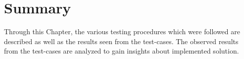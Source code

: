 \section{Summary}

Through this Chapter, the various testing procedures which were followed are described as well as the results seen from the test-cases. The observed results from the test-cases are analyzed to gain insights about implemented solution.
\clearpage
  